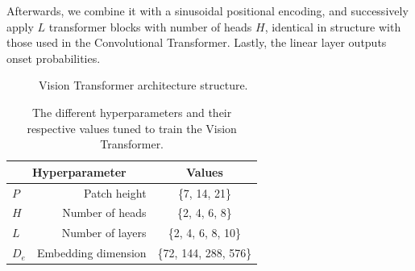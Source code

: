 Afterwards, we combine it with a sinusoidal positional encoding, and successively apply $L$ transformer blocks with number of heads $H$, identical in structure with those used in the Convolutional Transformer. Lastly, the linear layer outputs onset probabilities.

\begin{figure}[H]
    \hspace*{-0.5cm}
    \centering
    
    \caption{Vision Transformer architecture structure.}
    \label{ViTFigure}
\end{figure}

\begin{table}[H]
    \centering
    \begin{tabular}{lr|c}
        \multicolumn{2}{c|}{Hyperparameter} & Values       \\
        \hline
        $P$ & Patch height      & \{7, 14, 21\} \\
        $H$ & Number of heads     & \{2, 4, 6, 8\} \\
        $L$ & Number of layers      & \{2, 4, 6, 8, 10\} \\
        $D_e$ & Embedding dimension      & \{72, 144, 288, 576\} \\
    \end{tabular}
    \caption{The different hyperparameters and their respective values tuned to train the Vision Transformer.}
    \label{ViTHyperparams}
\end{table}